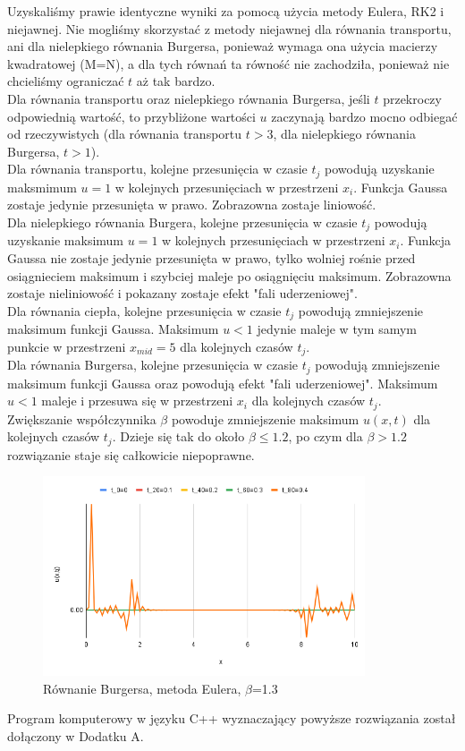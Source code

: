 \documentclass[12pt, a4paper]{article}
\begin{document}
Uzyskaliśmy prawie identyczne wyniki za pomocą użycia metody Eulera, RK2 i niejawnej. Nie mogliśmy skorzystać z metody niejawnej dla równania transportu, ani dla nielepkiego równania Burgersa, ponieważ wymaga ona użycia macierzy kwadratowej (M=N), a dla tych równań ta równość nie zachodziła, ponieważ nie chcieliśmy ograniczać $t$ aż tak bardzo.\\

Dla równania transportu oraz nielepkiego równania Burgersa, jeśli $t$ przekroczy odpowiednią wartość, to przybliżone wartości $u$ zaczynają bardzo mocno odbiegać od rzeczywistych (dla równania transportu $t>3$, dla nielepkiego równania Burgersa, $t>1$).\\

Dla równania transportu, kolejne przesunięcia w czasie $t_{j}$ powodują uzyskanie maksmimum $u=1$ w kolejnych przesunięciach w przestrzeni $x_{i}$.  Funkcja Gaussa zostaje jedynie przesunięta w prawo.  Zobrazowna zostaje liniowość.\\

Dla nielepkiego równania Burgera, kolejne przesunięcia w czasie $t_{j}$ powodują uzyskanie maksimum $u=1$ w kolejnych przesunięciach w przestrzeni $x_{i}$. Funkcja Gaussa nie zostaje jedynie przesunięta w prawo, tylko wolniej rośnie przed osiągnieciem maksimum i szybciej maleje po osiągnięciu maksimum. Zobrazowna zostaje nieliniowość i pokazany zostaje efekt "fali uderzeniowej".\\

Dla równania ciepła, kolejne przesunięcia w czasie $t_{j}$ powodują zmniejszenie maksimum funkcji Gaussa. Maksimum $u<1$ jedynie maleje w tym samym punkcie w przestrzeni $x_{mid}=5$ dla kolejnych czasów $t_{j}$.\\ 

Dla równania Burgersa, kolejne przesunięcia w czasie $t_{j}$ powodują zmniejszenie maksimum funkcji Gaussa oraz powodują efekt "fali uderzeniowej". Maksimum $u<1$ maleje i przesuwa się w przestrzeni $x_{i}$ dla kolejnych czasów $t_{j}$.\\

Zwiększanie współczynnika $\beta$ powoduje zmniejszenie maksimum $u(x,t)$ dla kolejnych czasów $t_{j}$. Dzieje się tak do około $\beta\leqslant1.2$, po czym dla  $\beta>1.2$ rozwiązanie staje się całkowicie niepoprawne.\\
\begin{figure}[h]
\caption{Równanie Burgersa, metoda Eulera, $\beta$=1.3}
\centering
\includegraphics[width=0.85\textwidth]{10}
\end{figure}

Program komputerowy w języku C++ wyznaczający powyższe rozwiązania został dołączony w Dodatku A.
\end{document}
